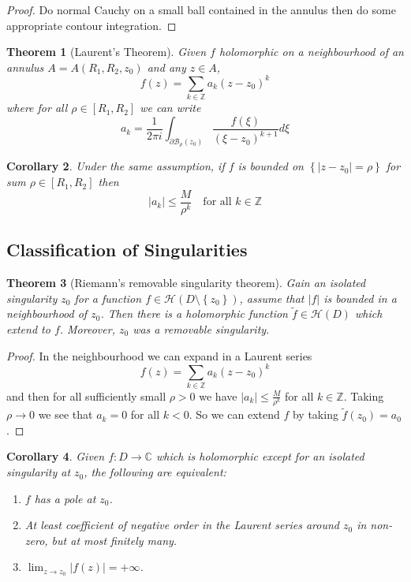 \documentclass[11pt]{article}
\newcommand{\abs}[1]{\left|#1\right|}
\newcommand{\C}{\mathbb{C}}
\newcommand{\Z}{\mathbb{Z}}
\newtheorem{theorem}{Theorem}[section]
\newtheorem{cor}[theorem]{Corollary}
\begin{document}
\begin{proof}
Do normal Cauchy on a small ball contained in the annulus then do some appropriate contour integration.
\end{proof}

\begin{theorem}[Laurent's Theorem]
Given $f$ holomorphic on a neighbourhood of an annulus $A=A(R_1, R_2, z_0)$ and any $z\in A$,
\[
	f(z)=\sum_{k\in\Z}a_k(z-z_0)^k
\]
where for all $\rho\in [R_1, R_2]$ we can write
\[
	a_k=\frac{1}{2\pi i}\int_{\partial \mathcal{B}_{\rho}(z_0)}\frac{f(\xi)}{\left(\xi-z_0\right)^{k+1}}d\xi
\]
\end{theorem}

\begin{cor}
	Under the same assumption, if $f$ is bounded on $\left\{\abs{z-z_0}=\rho\right\}$ for sum $\rho\in[R_1, R_2]$ then
	\[
		\abs{a_k}\leq\frac{M}{\rho^k}\quad\text{for all }k\in\Z
	\]
\end{cor}

\subsection{Classification of Singularities}
\begin{theorem}[Riemann's removable singularity theorem]
Gain an isolated singularity $z_0$ for a function $f\in\mathcal{H}(D\setminus\left\{z_0\right\})$, assume that $\abs{f}$ is bounded in a neighbourhood of $z_0$.
Then there is a holomorphic function $\widetilde{f}\in\mathcal{H}(D)$ which extend to $f$.
Moreover, $z_0$ was a removable singularity.
\end{theorem}

\begin{proof}
In the neighbourhood we can expand in a Laurent series
\[
	f(z)=\sum_{k\in\Z}a_k(z-z_0)^k
\]
and then for all sufficiently small $\rho>0$ we have $\abs{a_k}\leq\frac{M}{\rho^k}$ for all $k\in\Z$.
Taking $\rho\to 0$ we see that $a_k=0$ for all $k<0$.
So we can extend $f$ by taking $\widetilde{f}(z_0)=a_0$.
\end{proof}

\begin{cor}
Given $f:D\to\C$ which is holomorphic except for an isolated singularity at $z_0$, the following are equivalent:
\begin{enumerate}[label=(\roman*)]
	\item $f$ has a pole at $z_0$.
	\item At least coefficient of negative order in the Laurent series around $z_0$ in non-zero, but at most finitely many.
	\item $\lim_{z\to z_0}\abs{f(z)}=+\infty$.
\end{enumerate}
\end{cor}
\end{document}
